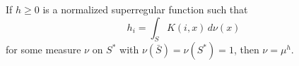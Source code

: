 If $h \geq 0$ is a normalized superregular function such that
$$h_i = \int_{S} K(i, x) \, d\nu(x)$$
for some measure $\nu$ on $S^*$ with $\nu(\bar{S}) = \nu(S^*) = 1$, then $\nu = \mu^h$.
